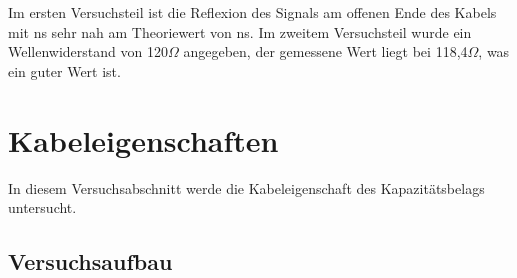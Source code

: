 \documentclass[12pt,a4paper]{article}
\begin{document}
Im ersten Versuchsteil ist die Reflexion des Signals am offenen Ende des Kabels mit \unit[296]{ns} sehr nah am Theoriewert von \unit[300]{ns}. Im zweitem Versuchsteil wurde ein Wellenwiderstand von 120$\Omega$ angegeben, der gemessene Wert liegt bei 118,4$\Omega$, was ein guter Wert ist.


\section{Kabeleigenschaften}

In diesem Versuchsabschnitt werde die Kabeleigenschaft des Kapazitätsbelags untersucht.

\subsection{Versuchsaufbau}
\end{document}

